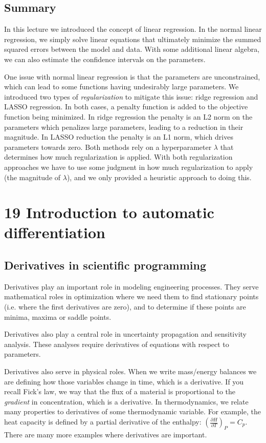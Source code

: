 \documentclass[11pt]{article}
\begin{document}
\subsection{Summary}
\label{sec:org70da9c5}

In this lecture we introduced the concept of linear regression. In the normal linear regression, we simply solve linear equations that ultimately minimize the summed squared errors between the model and data. With some additional linear algebra, we can also estimate the confidence intervals on the parameters.

One issue with normal linear regression is that the parameters are unconstrained, which can lead to some functions having undesirably large parameters. We introduced two types of \emph{regularization} to mitigate this issue: ridge regression and LASSO regression. In both cases, a penalty function is added to the objective function being minimized. In ridge regression the penalty is an L2 norm on the parameters which penalizes large parameters, leading to a reduction in their magnitude. In LASSO reduction the penalty is an L1 norm, which drives parameters towards zero. Both methods rely on a hyperparameter \(\lambda\) that determines how much regularization is applied. With both regularization approaches we have to use some judgment in how much regularization to apply (the magnitude of \(\lambda\)), and we only provided a heuristic approach to doing this.

\section{19 Introduction to automatic differentiation}
\label{sec:org68fd6df}

\subsection{Derivatives in scientific programming}
\label{sec:orgc16fe39}

Derivatives play an important role in modeling engineering processes. They serve mathematical roles in optimization where we need them to find stationary points (i.e. where the first derivatives are zero), and to determine if these points are minima, maxima or saddle points.

Derivatives also play a central role in uncertainty propagation and sensitivity analysis. These analyses require derivatives of equations with respect to parameters.

Derivatives also serve in physical roles. When we write mass/energy balances we are defining how those variables change in time, which is a derivative. If you recall Fick's law, we way that the flux of a material is proportional to the \emph{gradient} in concentration, which is a derivative. In thermodynamics, we relate many properties to derivatives of some thermodynamic variable. For example, the heat capacity is defined by a partial derivative of the enthalpy: \(\left(\frac{\partial H}{\partial T}\right)_P = C_p\). There are many more examples where derivatives are important.
\end{document}
